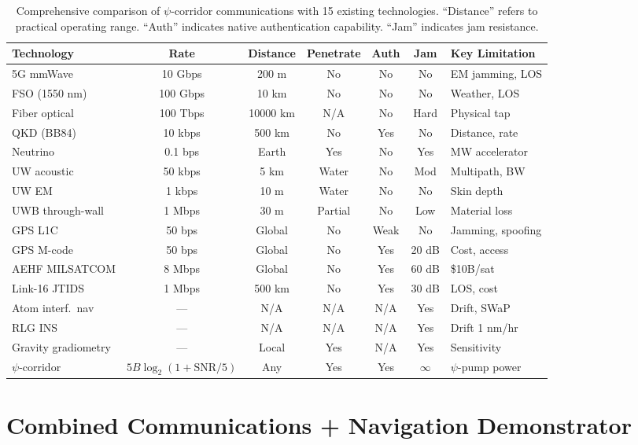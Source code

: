 \documentclass[twocolumn,superscriptaddress,prd,nofootinbib]{revtex4-2}
\newcommand{\SNR}{\mathrm{SNR}}
\begin{document}
\begin{table}[t]
\centering
\caption{Comprehensive comparison of $\psi$-corridor communications
with 15 existing technologies. ``Distance'' refers to practical operating
range. ``Auth'' indicates native authentication capability.
``Jam'' indicates jam resistance.}
\label{tab:comprehensive}
\begin{ruledtabular}
\begin{tabular}{lcccccl}
Technology & Rate & Distance & Penetrate & Auth & Jam & Key Limitation \\
\hline
5G mmWave & 10 Gbps & 200 m & No & No & No & EM jamming, LOS \\
FSO (1550 nm) & 100 Gbps & 10 km & No & No & No & Weather, LOS \\
Fiber optical & 100 Tbps & 10000 km & N/A & No & Hard & Physical tap \\
QKD (BB84) & 10 kbps & 500 km & No & Yes & No & Distance, rate \\
Neutrino & 0.1 bps & Earth & Yes & No & Yes & MW accelerator \\
UW acoustic & 50 kbps & 5 km & Water & No & Mod & Multipath, BW \\
UW EM & 1 kbps & 10 m & Water & No & No & Skin depth \\
UWB through-wall & 1 Mbps & 30 m & Partial & No & Low & Material loss \\
GPS L1C & 50 bps & Global & No & Weak & No & Jamming, spoofing \\
GPS M-code & 50 bps & Global & No & Yes & 20 dB & Cost, access \\
AEHF MILSATCOM & 8 Mbps & Global & No & Yes & 60 dB & \$10B/sat \\
Link-16 JTIDS & 1 Mbps & 500 km & No & Yes & 30 dB & LOS, cost \\
Atom interf.\ nav & --- & N/A & N/A & N/A & Yes & Drift, SWaP \\
RLG INS & --- & N/A & N/A & N/A & Yes & Drift 1 nm/hr \\
Gravity gradiometry & --- & Local & Yes & N/A & Yes & Sensitivity \\
\hline
$\psi$-corridor & $5B\log_2(1\!+\!\SNR/5)$ & Any & Yes & Yes & $\infty$ & $\psi$-pump power \\
\end{tabular}
\end{ruledtabular}
\end{table}

\section{Combined Communications + Navigation Demonstrator}
\label{sec:demonstrator}
\end{document}
